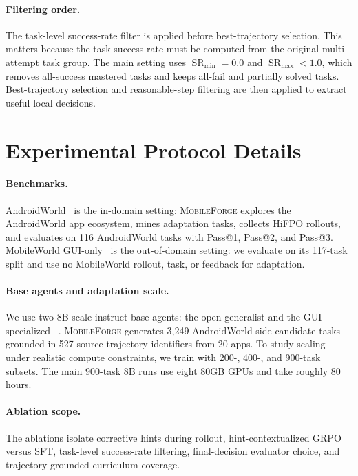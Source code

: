 \documentclass{llmxive}
\providecommand{\ourmethod}{\textsc{MobileForge}\xspace}
\providecommand{\hifpo}{HiFPO\xspace}
\begin{document}
\paragraph{Filtering order.}
The task-level success-rate filter is applied before best-trajectory selection. This matters because the task success rate must be computed from the original multi-attempt task group. The main setting uses $\operatorname{SR}_{\min}=0.0$ and $\operatorname{SR}_{\max}<1.0$, which removes all-success mastered tasks and keeps all-fail and partially solved tasks. Best-trajectory selection and reasonable-step filtering are then applied to extract useful local decisions.

\section{Experimental Protocol Details}
\label{sec:appendix_experimental_protocol}

\paragraph{Benchmarks.}
AndroidWorld~\citep{rawles2024androidworld} is the in-domain setting: \ourmethod explores the AndroidWorld app ecosystem, mines adaptation tasks, collects \hifpo rollouts, and evaluates on 116 AndroidWorld tasks with Pass@1, Pass@2, and Pass@3. MobileWorld GUI-only~\citep{kong2026mobileworld} is the out-of-domain setting: we evaluate on its 117-task split and use no MobileWorld rollout, task, or feedback for adaptation.

\paragraph{Base agents and adaptation scale.}
We use two 8B-scale instruct base agents: the open generalist  and the GUI-specialized ~\citep{bai2025qwen3,xu2026mobile}. \ourmethod generates 3,249 AndroidWorld-side candidate tasks grounded in 527 source trajectory identifiers from 20 apps. To study scaling under realistic compute constraints, we train with 200-, 400-, and 900-task subsets. The main 900-task 8B runs use eight 80GB GPUs and take roughly 80 hours.

\paragraph{Ablation scope.}
The ablations isolate corrective hints during rollout, hint-contextualized GRPO versus SFT, task-level success-rate filtering, final-decision evaluator choice, and trajectory-grounded curriculum coverage.
\end{document}
